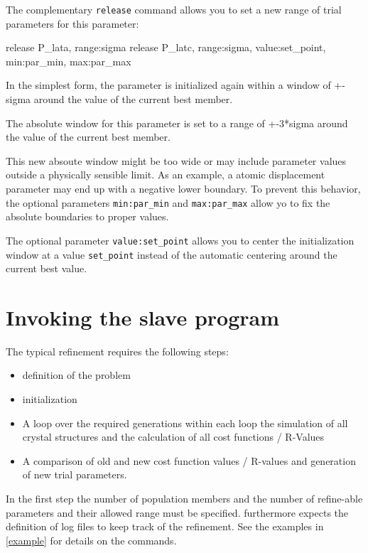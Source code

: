 The complementary {\tt release} command allows you to set a new range of
trial parameters for this parameter:

\begin{MacVerbatim}
release P_lata, range:sigma
release P_latc, range:sigma, value:set_point, min:par_min, max:par_max
\end{MacVerbatim}

In the simplest form, the parameter is initialized again within a 
window of +-sigma around the value of the current best member. 

The absolute window for this parameter is set to a range of +-3*sigma
around the value of the current best member.

This new absoute window might be too wide or may include parameter 
values outside a physically sensible limit. As an example, a 
atomic displacement parameter may end up with a negative lower 
boundary. To prevent this behavior, the optional parameters
{\tt min:par\_min} and {\tt max:par\_max} allow yo to fix the 
absolute boundaries to proper values. 

The optional parameter {\tt value:set\_point} allows you to center
the initialization window at a value {\tt set\_point} instead
of the automatic centering around the current best value.


\section{Invoking the slave program \label{diff-invoke}}

The typical refinement requires the following steps:

\begin{itemize}
 \item definition of the problem
 \item initialization 
 \item A loop over the required generations
within each loop the simulation of all crystal structures and the calculation 
of all cost functions / R-Values
 \item A comparison of old and new cost function values / R-values and generation
of new trial parameters.
\end{itemize}

In the first step the number of population members and the number of refine-able
parameters and their allowed range must be specified. \Diffev furthermore 
expects the definition of log files to keep track of the refinement. See the
examples in \ref{example} for details on the commands.


